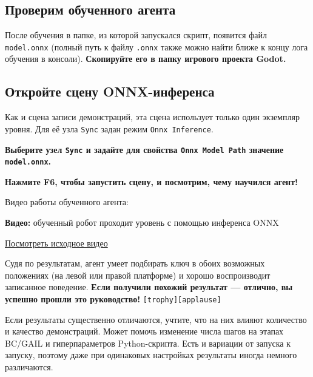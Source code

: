 \documentclass[11pt,a4paper]{article}
\begin{document}
\subsection{Проверим обученного агента}\label{lets-test-the-trained-agent}

После обучения в папке, из которой запускался скрипт, появится файл \passthrough{\lstinline!model.onnx!} (полный путь к файлу \passthrough{\lstinline!.onnx!} также можно найти ближе к концу лога обучения в консоли). \textbf{Скопируйте его в папку игрового проекта Godot.}

\subsection{Откройте сцену ONNX-инференса}\label{open-the-onnx-inference-scene}

Как и сцена записи демонстраций, эта сцена использует только один экземпляр уровня. Для её узла \passthrough{\lstinline!Sync!} задан режим \passthrough{\lstinline!Onnx Inference!}.

\textbf{Выберите узел \passthrough{\lstinline!Sync!} и задайте для свойства \passthrough{\lstinline!Onnx Model Path!} значение \passthrough{\lstinline!model.onnx!}.}


\textbf{Нажмите F6, чтобы запустить сцену, и посмотрим, чему научился агент!}

Видео работы обученного агента:

\begin{coursenote}\textbf{Видео:} обученный робот проходит уровень с помощью инференса ONNX\par\small\href{https://huggingface.co/datasets/huggingface-deep-rl-course/course-images/resolve/main/en/unit13/onnx_inference_test.mp4}{Посмотреть исходное видео}\end{coursenote}

Судя по результатам, агент умеет подбирать ключ в обоих возможных положениях (на левой или правой платформе) и хорошо воспроизводит записанное поведение. \textbf{Если получили похожий результат --- отлично, вы успешно прошли это руководство!} \texttt{[trophy]}\texttt{[applause]}

Если результаты существенно отличаются, учтите, что на них влияют количество и качество демонстраций. Может помочь изменение числа шагов на этапах BC/GAIL и гиперпараметров Python-скрипта. Есть и вариации от запуска к запуску, поэтому даже при одинаковых настройках результаты иногда немного различаются.
\end{document}
